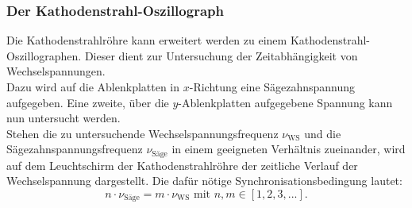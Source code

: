 \subsubsection{Der Kathodenstrahl-Oszillograph}
Die Kathodenstrahlröhre kann erweitert werden zu einem Kathodenstrahl-Oszillographen.
Dieser dient zur Untersuchung der Zeitabhängigkeit von Wechselspannungen.\\
Dazu wird auf die Ablenkplatten in $x$-Richtung eine Sägezahnspannung aufgegeben. Eine zweite, über die $y$-Ablenkplatten aufgegebene Spannung kann nun untersucht werden.
\\Stehen die zu untersuchende Wechselspannungsfrequenz $\nu_\mathrm{WS}$ und die Sägezahnspannungsfrequenz $\nu_\mathrm{Säge}$ in einem geeigneten Verhältnis zueinander, wird auf dem Leuchtschirm der Kathodenstrahlröhre der zeitliche Verlauf der Wechselspannung dargestellt.
Die dafür nötige Synchronisationsbedingung lautet:
\begin{equation}
    n\cdot \nu_\mathrm{Säge}=m \cdot \nu_\mathrm{WS} \text{ mit } n,m \in [1,2,3,...] \text{.}
\end{equation}

